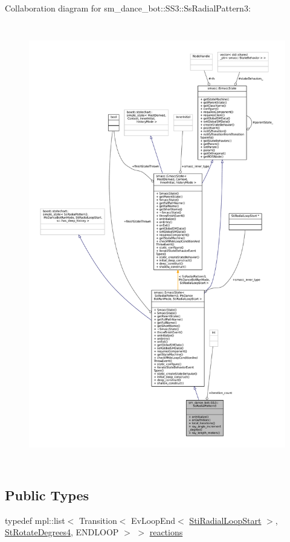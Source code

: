 Collaboration diagram for sm\+\_\+dance\+\_\+bot\+:\+:S\+S3\+:\+:Ss\+Radial\+Pattern3\+:
\nopagebreak
\begin{figure}[H]
\begin{center}
\leavevmode
\includegraphics[height=550pt]{structsm__dance__bot_1_1SS3_1_1SsRadialPattern3__coll__graph}
\end{center}
\end{figure}
\subsection*{Public Types}
\begin{DoxyCompactItemize}
\item 
typedef mpl\+::list$<$ Transition$<$ Ev\+Loop\+End$<$ \hyperlink{structsm__dance__bot_1_1radial__motion__states_1_1StiRadialLoopStart}{Sti\+Radial\+Loop\+Start} $>$, \hyperlink{structsm__dance__bot_1_1StRotateDegrees4}{St\+Rotate\+Degrees4}, E\+N\+D\+L\+O\+OP $>$ $>$ \hyperlink{structsm__dance__bot_1_1SS3_1_1SsRadialPattern3_aa427cf1c1d77bc04e23acf4fb4bef9f1}{reactions}
\end{DoxyCompactItemize}
